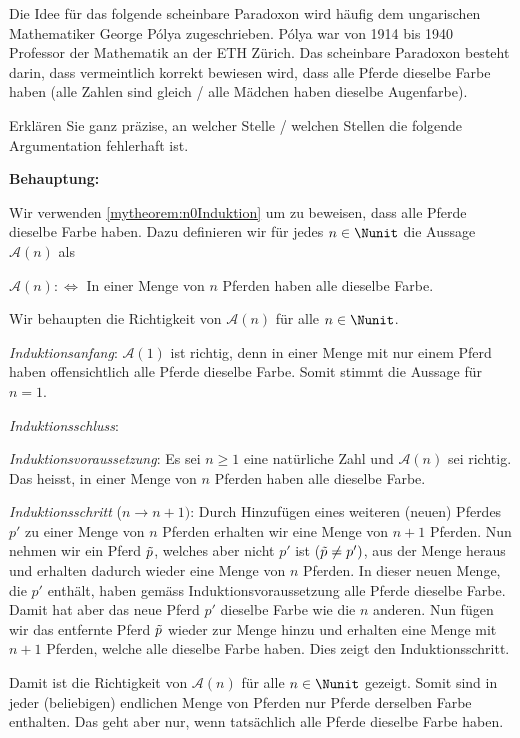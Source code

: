 \clearpage
\begin{myexercise}\label{myexercise:0268}
	Die Idee für das folgende scheinbare Paradoxon wird häufig dem ungarischen Mathematiker George Pólya zugeschrieben. Pólya war von 1914 bis 1940 Professor der Mathematik an der ETH Zürich. Das scheinbare Paradoxon besteht darin, dass vermeintlich korrekt bewiesen wird, dass alle Pferde dieselbe Farbe haben (alle Zahlen sind gleich / alle Mädchen haben dieselbe Augenfarbe).

	Erklären Sie ganz präzise, an welcher Stelle / welchen Stellen die folgende Argumentation fehlerhaft ist.

	\noindent
	\textbf{Behauptung:}

	Wir verwenden \cref{mytheorem:n0Induktion} um zu beweisen, dass alle Pferde dieselbe Farbe haben. Dazu definieren wir für jedes $n\in\Nunit$ die Aussage $\mathcal{A}(n)$ als
	\begin{center}
		$\mathcal{A}(n) :\iff $ In einer Menge von $n$ Pferden haben alle dieselbe Farbe.
	\end{center}
	Wir behaupten die Richtigkeit von $\mathcal{A}(n)$ für alle $n\in\Nunit$.

	\begin{myproof}
		\begin{aenum}
			\item \textit{Induktionsanfang}: $\mathcal{A}(1)$ ist richtig, denn in einer Menge mit nur einem Pferd haben offensichtlich alle Pferde dieselbe Farbe. Somit stimmt die Aussage für $n=1$.
			\item \textit{Induktionsschluss}:
			\begin{renum}
				\item \textit{Induktionsvoraussetzung}: Es sei $n\geq 1$ eine natürliche Zahl und $\mathcal{A}(n)$ sei richtig. Das heisst, in einer Menge von $n$ Pferden haben alle dieselbe Farbe.
				\item \textit{Induktionsschritt} ($n\to n+1)$: Durch Hinzufügen eines weiteren (neuen) Pferdes $p'$ zu einer Menge von $n$ Pferden erhalten wir eine Menge von $n+1$ Pferden. Nun nehmen wir ein Pferd $\Tilde{p}$, welches aber nicht $p'$ ist ($\Tilde{p}\neq p')$, aus der Menge heraus und erhalten dadurch wieder eine Menge von $n$ Pferden. In dieser neuen Menge, die $p'$ enthält, haben gemäss Induktionsvoraussetzung alle Pferde dieselbe Farbe. Damit hat aber das neue Pferd $p'$ dieselbe Farbe wie die $n$ anderen. Nun fügen wir das entfernte Pferd $\Tilde{p}$ wieder zur Menge hinzu und erhalten eine Menge mit $n+1$ Pferden, welche alle dieselbe Farbe haben. Dies zeigt den Induktionsschritt.
			\end{renum}
		\end{aenum}
		Damit ist die Richtigkeit von $\mathcal{A}(n)$ für alle $n\in\Nunit$ gezeigt. Somit sind in jeder (beliebigen) endlichen Menge von Pferden nur Pferde derselben Farbe enthalten. Das geht aber nur, wenn tatsächlich alle Pferde dieselbe Farbe haben.
	\end{myproof}
\end{myexercise}


